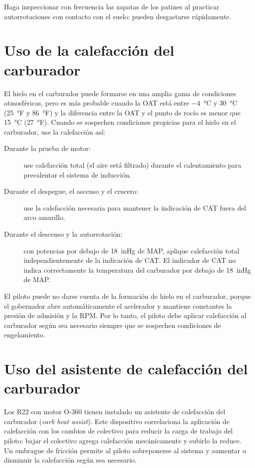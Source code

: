 \begin{nota}
Haga inspeccionar con frecuencia las zapatas de los patines al practicar autorrotaciones con contacto con el suelo: pueden desgastarse rápidamente.
\end{nota}

\section{Uso de la calefacción del carburador}
\label{sec:carb-heat}

El hielo en el carburador puede formarse en una amplia gama de condiciones atmosféricas, pero es más probable cuando la OAT está entre $-4$~°C y 30~°C (25~°F y 86~°F) y la diferencia entre la OAT y el punto de rocío es menor que 15~°C (27~°F). Cuando se sospechen condiciones propicias para el hielo en el carburador, use la calefacción así:

\begin{description}
\item[Durante la prueba de motor:] use calefacción total (el aire está filtrado) durante el calentamiento para precalentar el sistema de inducción.
\item[Durante el despegue, el ascenso y el crucero:] use la calefacción necesaria para mantener la indicación de CAT fuera del arco amarillo.
\item[Durante el descenso y la autorrotación:] con potencias por debajo de 18~inHg de MAP, aplique calefacción total independientemente de la indicación de CAT. El indicador de CAT no indica correctamente la temperatura del carburador por debajo de 18~inHg de MAP.
\end{description}

\begin{precaucion}
El piloto puede no darse cuenta de la formación de hielo en el carburador, porque el gobernador abre automáticamente el acelerador y mantiene constantes la presión de admisión y la RPM. Por lo tanto, el piloto debe aplicar calefacción al carburador según sea necesario siempre que se sospechen condiciones de engelamiento.
\end{precaucion}

\section{Uso del asistente de calefacción del carburador}

Los R22 con motor O-360 tienen instalado un asistente de calefacción del carburador (\emph{carb heat assist}). Este dispositivo correlaciona la aplicación de calefacción con los cambios de colectivo para reducir la carga de trabajo del piloto: bajar el colectivo agrega calefacción mecánicamente y subirlo la reduce. Un embrague de fricción permite al piloto sobreponerse al sistema y aumentar o disminuir la calefacción según sea necesario.

